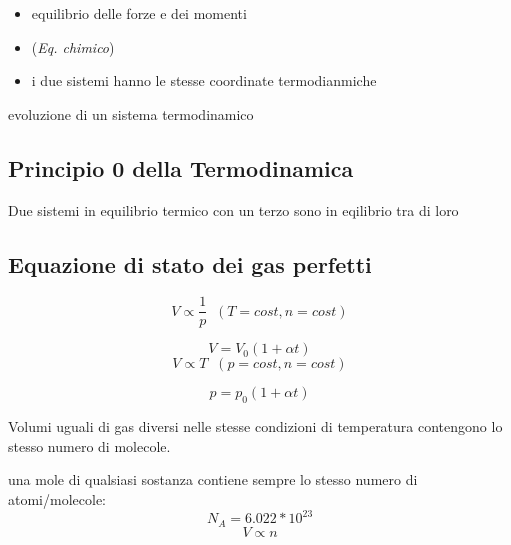 \vspace{\baselineskip}
\begin{itemize}
    \item {} equilibrio delle forze e dei momenti
    \item (\emph{Eq. chimico}) 
    \item {} i due sistemi hanno le stesse coordinate termodianmiche
\end{itemize}

 evoluzione di un sistema termodinamico


\subsection{Principio 0 della Termodinamica}
\Def{} Due sistemi in equilibrio termico con un terzo sono in eqilibrio tra di loro

\subsection{Equazione di stato dei gas perfetti}

\begin{equation}
    V \propto \frac{1}{p} \;\; (T= cost, n=cost)
\end{equation}

\vspace{\baselineskip}
\begin{equation}
    V = V_0 (1+\alpha t)
\end{equation}
\[
    V \propto T \;\; (p= cost, n=cost)
\]

\vspace{\baselineskip}
\begin{equation}
    p = p_0 (1+\alpha t)
\end{equation}

\vspace{\baselineskip}
 Volumi uguali di gas diversi nelle stesse condizioni di temperatura contengono lo stesso numero di molecole.

una mole di qualsiasi sostanza contiene sempre lo stesso numero di atomi/molecole: 
\begin{equation}
    N_A = 6.022 * 10^{23}
    \label{avo}
\end{equation}
\[
    V \propto n
\]

